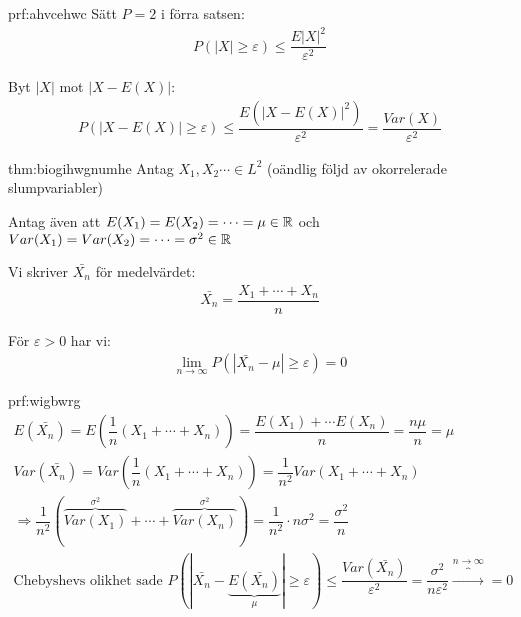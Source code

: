 \begin{prf}{prf:ahvcehwc}
  Sätt $P=2$ i förra satsen:
  \begin{equation*}
    \begin{gathered}
      P(\left|X\right|\geq\varepsilon)\leq\dfrac{E\left|X\right|^2}{\varepsilon^2}
    \end{gathered}
  \end{equation*}\par
  \noindent Byt $\left|X\right|$ mot $\left|X-E(X)\right|$:
  \begin{equation*}
    \begin{gathered}
      P(\left|X-E(X)\right|\geq\varepsilon)\leq\dfrac{E(\left|X-E(X)\right|^2)}{\varepsilon^2} = \dfrac{Var(X)}{\varepsilon^2}
    \end{gathered}
  \end{equation*}
\end{prf}
\par\bigskip
\begin{theo}{thm:biogihwgnumhe}
  Antag $X_1,X_2\cdots\in L^2$ (oändlig följd av okorrelerade slumpvariabler)\par
  \noindent Antag även att $E(X_1) = E(X_2)=\cdots = \mu\in\mathbb{R}$ och $Var(X_1)=Var(X_2)=\cdots=\sigma^2\in\mathbb{R}$\par
  \noindent Vi skriver $\bar{X_n}$ för medelvärdet:
  \begin{equation*}
    \begin{gathered}
      \bar{X_n} = \dfrac{X_1+\cdots+X_n}{n}
    \end{gathered}
  \end{equation*}\par
  \noindent För $\varepsilon >0$ har vi:
  \begin{equation*}
    \begin{gathered}
      \lim_{n\to\infty}P\left(\left|\bar{X_n}-\mu\right|\geq\varepsilon\right) = 0
    \end{gathered}
  \end{equation*}
\end{theo}
\newpage
\begin{prf}{prf:wigbwrg}
  \begin{equation*}
    \begin{gathered}
      E(\bar{X_n}) = E\left(\dfrac{1}{n}(X_1+\cdots+X_n)\right) = \dfrac{E(X_1)+\cdots E(X_n)}{n} = \dfrac{n\mu}{n} = \mu\\
      Var(\bar{X_n}) = Var\left(\dfrac{1}{n}(X_1+\cdots+X_n)\right) = \dfrac{1}{n^2}Var(X_1+\cdots+X_n)\\
      \Rightarrow \dfrac{1}{n^2}(\overbrace{Var(X_1)}^{\text{$\sigma^2$}}+\cdots+\overbrace{Var(X_n)}^{\text{$\sigma^2$}}) = \dfrac{1}{n^2}\cdot n\sigma^2 = \dfrac{\sigma^2}{n}\\
      \text{Chebyshevs olikhet sade } P\left(\left|\bar{X_n}-\underbrace{E(\bar{X_n})}_{\text{$\mu$}}\right|\geq\varepsilon\right)\leq \dfrac{Var(\bar{X_n})}{\varepsilon^2} = \dfrac{\sigma^2}{n\varepsilon^2}\overbrace{\to}^{\text{$n\to\infty$}}=0
    \end{gathered}
  \end{equation*}
\end{prf}
